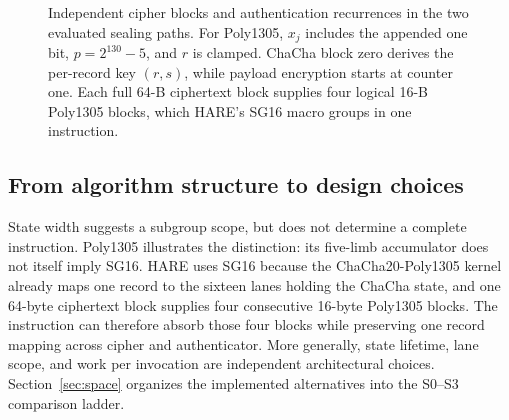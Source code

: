 \documentclass[conference]{IEEEtran}
\begin{document}
\begin{figure}[t]
\caption{Independent cipher blocks and authentication recurrences in the two
evaluated sealing paths. For Poly1305, $x_j$ includes the appended one bit,
$p=2^{130}-5$, and $r$ is clamped. ChaCha block zero derives the per-record
key $(r,s)$, while payload encryption starts at counter one. Each full 64-B
ciphertext block supplies four logical 16-B Poly1305 blocks, which HARE's
SG16 macro groups in one instruction.}
\label{fig:aead-flow}
\end{figure}

\subsection{From algorithm structure to design choices}
State width suggests a subgroup scope, but does not determine a complete
instruction. Poly1305 illustrates the distinction: its five-limb accumulator
does not itself imply SG16. HARE uses SG16 because the ChaCha20-Poly1305 kernel
already maps one record to the sixteen lanes holding the ChaCha state, and one
64-byte ciphertext block supplies four consecutive 16-byte Poly1305 blocks.
The instruction can therefore absorb those four blocks while preserving one
record mapping across cipher and authenticator. More generally, state
lifetime, lane scope, and work per invocation are independent architectural
choices. Section~\ref{sec:space} organizes the implemented alternatives into
the S0--S3 comparison ladder.
\end{document}
